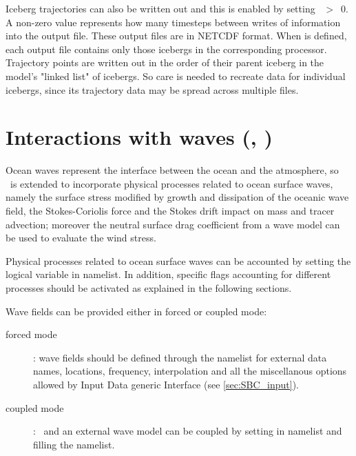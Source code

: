 \documentclass[../main/NEMO_manual]{subfiles}
\begin{document}
Iceberg trajectories can also be written out and this is enabled by setting ~$>$~0.
A non-zero value represents how many timesteps between writes of information into the output file.
These output files are in NETCDF format.
When  is defined, each output file contains only those icebergs in the corresponding processor.
Trajectory points are written out in the order of their parent iceberg in the model's "linked list" of icebergs.
So care is needed to recreate data for individual icebergs,
since its trajectory data may be spread across multiple files.

\section[Interactions with waves (\textit{sbcwave.F90}, \forcode{ln_wave})]{Interactions with waves (\protect{}, \protect{})}
\label{sec:SBC_wave}

\begin{listing}
  \caption{}
  \label{lst:namsbc_wave}
\end{listing}

Ocean waves represent the interface between the ocean and the atmosphere, so \NEMO\ is extended to incorporate
physical processes related to ocean surface waves, namely the surface stress modified by growth and
dissipation of the oceanic wave field, the Stokes-Coriolis force and the Stokes drift impact on mass and
tracer advection; moreover the neutral surface drag coefficient from a wave model can be used to evaluate
the wind stress.

Physical processes related to ocean surface waves can be accounted by setting the logical variable
 in  namelist. In addition, specific flags accounting for
different processes should be activated as explained in the following sections.

Wave fields can be provided either in forced or coupled mode:
\begin{description}
\item [forced mode]: wave fields should be defined through the  namelist
for external data names, locations, frequency, interpolation and all the miscellanous options allowed by
Input Data generic Interface (see \autoref{sec:SBC_input}).
\item [coupled mode]: \NEMO\ and an external wave model can be coupled by setting 
in  namelist and filling the  namelist.
\end{description}
\end{document}

